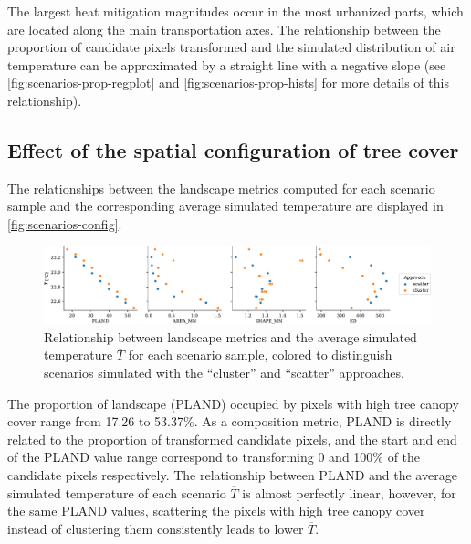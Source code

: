 \documentclass[10pt,letterpaper]{article}
\begin{document}
The largest heat mitigation magnitudes occur in the most urbanized parts, which are located along the main transportation axes.
The relationship between the proportion of candidate pixels transformed and the simulated distribution of air temperature can be approximated by a straight line with a negative slope (see \autoref{fig:scenarios-prop-regplot} and \autoref{fig:scenarios-prop-hists} for more details of this relationship).


\subsection*{Effect of the spatial configuration of tree cover}

The relationships between the landscape metrics computed for each scenario sample and the corresponding average simulated temperature are displayed in \autoref{fig:scenarios-config}.
\begin{figure}
  \begin{adjustwidth}{-.4\textwidth}{0cm}  
    \includegraphics[width=.99\linewidth]{figures/scenarios-config}
    \caption{\label{fig:scenarios-config} Relationship between landscape metrics and the average simulated temperature $\overline{T}$ for each scenario sample, colored to distinguish scenarios simulated with the ``cluster'' and ``scatter'' approaches.}    
  \end{adjustwidth}
\end{figure}
The proportion of landscape (PLAND) occupied by pixels with high tree canopy cover range from 17.26 to 53.37\%. As a composition metric, PLAND is directly related to the proportion of transformed candidate pixels, and the start and end of the PLAND value range correspond to transforming 0 and 100\% of the candidate pixels respectively.
The relationship between PLAND and the average simulated temperature of each scenario $\overline{T}$ is almost perfectly linear, however, for the same PLAND values, scattering the pixels with high tree canopy cover instead of clustering them consistently leads to lower $\overline{T}$.
\end{document}
